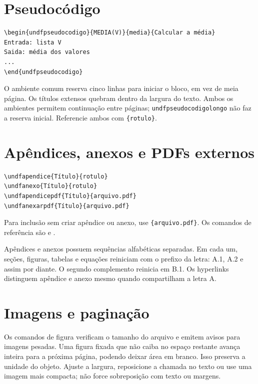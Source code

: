 \section{Pseudocódigo}

\begin{lstlisting}
\begin{undfpseudocodigo}{MEDIA(V)}{media}{Calcular a média}
Entrada: lista V
Saida: média dos valores
...
\end{undfpseudocodigo}
\end{lstlisting}

O ambiente comum reserva cinco linhas para iniciar o bloco, em vez de meia página.
Os títulos extensos quebram dentro da largura do texto. Ambos os ambientes permitem
continuação entre páginas; \texttt{undfpseudocodigolongo} não faz a reserva inicial.
Referencie ambos com \texttt{\string\pseudocodigoref\{rotulo\}}.

\section{Apêndices, anexos e PDFs externos}

\begin{lstlisting}
\undfapendice{Título}{rotulo}
\undfanexo{Título}{rotulo}
\undfapendicepdf{Título}{arquivo.pdf}
\undfanexarpdf{Título}{arquivo.pdf}
\end{lstlisting}

Para inclusão sem criar apêndice ou anexo, use \texttt{\string\undfincluirpdf\{arquivo.pdf\}}. Os comandos de referência são \texttt{\string\apendiceref} e \texttt{\string\anexoref}.

Apêndices e anexos possuem sequências alfabéticas separadas. Em cada um, seções,
figuras, tabelas e equações reiniciam com o prefixo da letra: A.1, A.2 e assim por
diante. O segundo complemento reinicia em B.1. Os hyperlinks distinguem apêndice
e anexo mesmo quando compartilham a letra A.

\section{Imagens e paginação}

Os comandos de figura verificam o tamanho do arquivo e emitem avisos para imagens pesadas. Uma figura fixada que não caiba no espaço restante avança inteira para a próxima página, podendo deixar área em branco. Isso preserva a unidade do objeto. Ajuste a largura, reposicione a chamada no texto ou use uma imagem mais compacta; não force sobreposição com texto ou margens.
